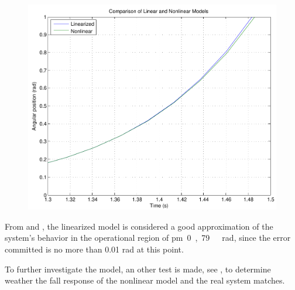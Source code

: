 \begin{minipage}{\linewidth}
\begin{minipage}{0.45\linewidth}
\begin{figure}[H]
			\includegraphics[scale=.4]{figures/LinearizedVSNonlinearZoom}
			\centering
			\vspace{-.1cm}
			\captionsetup{justification=centering}
			\label{LinearizedVSNonlinearZoom}
		\end{figure}\vspace{-5mm}
	\end{minipage}
\end{minipage}

From  and , the linearized model is considered a good approximation of the system's behavior in the operational region of \si{\pm 0,79\ rad}, since the error committed is no more than 0.01 rad at this point.

To further investigate the model, an other test is made, see , to determine weather the fall response of the nonlinear model and the real system matches.

